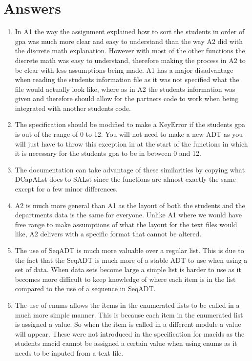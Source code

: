 \documentclass[12pt]{article}
\begin{document}
\section{Answers}

\begin{enumerate}

\item In A1 the way the assignment explained how to sort the students in order of gpa was much more clear and easy to understand than the way A2 did with the discrete math explanation. However with most of the other functions the discrete math was easy to understand, therefore making the process in A2 to be clear with less assumptions being made. A1 has a major disadvantage when reading the students information file as it was not specified what the file would actually look like, where as in A2 the students information was given and therefore should allow for the partners code to work when being integrated with another students code.

\item The specification should be modified to make a KeyError if the students gpa is out of the range of 0 to 12. You will not need to make a new ADT as you will just have to throw this exception in at the start of the functions in which it is necessary for the students gpa to be in between 0 and 12.

\item The documentation can take advantage of these similarities by copying what DCapALst does to SALst since the functions are almost exactly the same except for a few minor differences.

\item A2 is much more general than A1 as the layout of both the students and the departments data is the same for everyone. Unlike A1 where we would have free range to make assumptions of what the layout for the text files would like, A2 delivers with a specific format that cannot be altered.

\item The use of SeqADT is much more valuable over a regular list. This is due to the fact that the SeqADT is much more of a stable ADT to use when using a set of data. When data sets become large a simple list is harder to use as it becomes more difficult to keep knowledge of where each item is in the list compared to the use of a sequence in SeqADT.

\item The use of enums allows the items in the enumerated lists to be called in a much more simple manner. This is because each item in the enumerated list is assigned a value. So when the item is called in a different module a value will appear. These were not introduced in the specification for macids as the students macid cannot be assigned a certain value when using enums as it needs to be inputed from a text file.


\end{enumerate}
\end{document}

